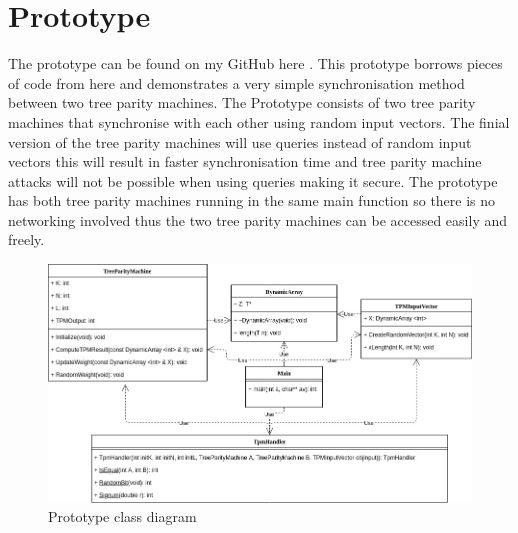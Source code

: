 \section{Prototype}
The prototype can be found on my GitHub here \cite{prototype-github}. This prototype borrows pieces of code from here \cite{SagunmsNeuroCrypto} and demonstrates a very simple synchronisation method between two tree parity machines. The Prototype consists of two tree parity machines that synchronise with each other using random input vectors. The finial version of the tree parity machines will use queries instead of random input vectors this will result in faster synchronisation time and tree parity machine attacks will not be possible when using queries making it secure.
The prototype has both tree parity machines running in the same main function so there is no networking involved thus the two tree parity machines can be accessed easily and freely.   
\begin{figure}[!h]
  \centering
      \includegraphics[width=1\textwidth]{Figures/TreeParityMachine.jpg}
  \caption[Prototype class diagram]{Prototype class diagram}
  \label{fig:prototype}
\end{figure}

